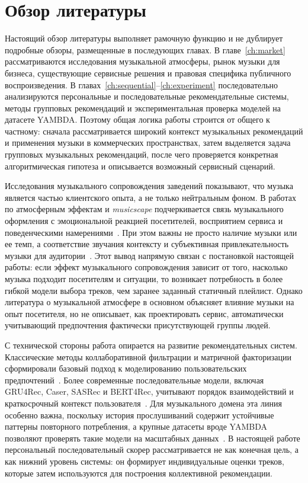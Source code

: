 \chapter*{Обзор литературы}

Настоящий обзор литературы выполняет рамочную функцию и не дублирует подробные обзоры, размещенные в последующих главах. В главе~\ref{ch:market} рассматриваются исследования музыкальной атмосферы, рынок музыки для бизнеса, существующие сервисные решения и правовая специфика публичного воспроизведения. В главах~\ref{ch:sequential}--\ref{ch:experiment} последовательно анализируются персональные и последовательные рекомендательные системы, методы групповых рекомендаций и экспериментальная проверка моделей на датасете YAMBDA. Поэтому общая логика работы строится от общего к частному: сначала рассматривается широкий контекст музыкальных рекомендаций и применения музыки в коммерческих пространствах, затем выделяется задача групповых музыкальных рекомендаций, после чего проверяется конкретная алгоритмическая гипотеза и описывается возможный сервисный сценарий.

Исследования музыкального сопровождения заведений показывают, что музыка является частью клиентского опыта, а не только нейтральным фоном. В работах по атмосферным эффектам и \textit{musicscape} подчеркивается связь музыкального оформления с эмоциональной реакцией посетителей, восприятием сервиса и поведенческими намерениями~\cite{roschk2017atmospheric,trompeta2022music}. При этом важны не просто наличие музыки или ее темп, а соответствие звучания контексту и субъективная привлекательность музыки для аудитории~\cite{caldwell2002tempo,demoulin2011music}. Этот вывод напрямую связан с постановкой настоящей работы: если эффект музыкального сопровождения зависит от того, насколько музыка подходит посетителям и ситуации, то возникает потребность в более гибкой модели выбора треков, чем заранее заданный статичный плейлист. Однако литература о музыкальной атмосфере в основном объясняет влияние музыки на опыт посетителя, но не описывает, как проектировать сервис, автоматически учитывающий предпочтения фактически присутствующей группы людей.

С технической стороны работа опирается на развитие рекомендательных систем. Классические методы коллаборативной фильтрации и матричной факторизации сформировали базовый подход к моделированию пользовательских предпочтений~\cite{koren2009matrix,rendle2009bpr}. Более современные последовательные модели, включая GRU4Rec, Caser, SASRec и BERT4Rec, учитывают порядок взаимодействий и краткосрочный контекст пользователя~\cite{hidasi2016session,tang2018caser,sasrec2018,bert4rec2019}. Для музыкального домена эта линия особенно важна, поскольку история прослушиваний содержит устойчивые паттерны повторного потребления, а крупные датасеты вроде YAMBDA позволяют проверять такие модели на масштабных данных~\cite{abbattista2024sequential,yambda2025}. В настоящей работе персональный последовательный скорер рассматривается не как конечная цель, а как нижний уровень системы: он формирует индивидуальные оценки треков, которые затем используются для построения коллективной рекомендации.

